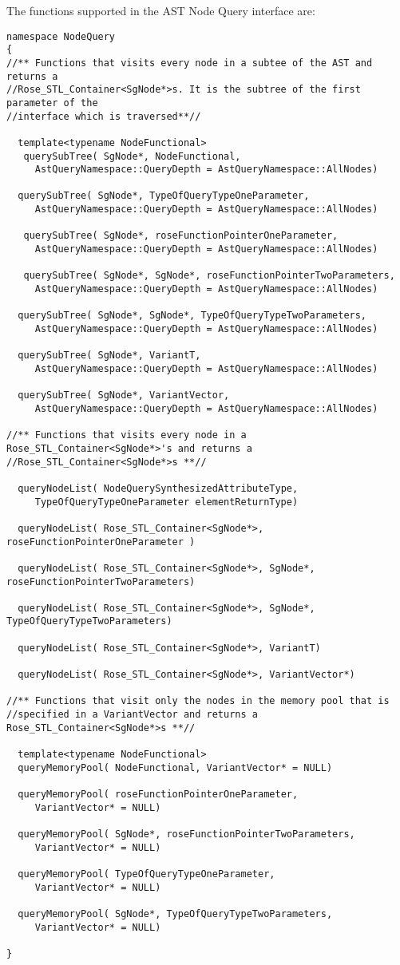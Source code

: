    The functions supported in the AST Node Query interface are:
{\mySmallFontSize
\begin{verbatim}
namespace NodeQuery
{
//** Functions that visits every node in a subtee of the AST and returns a
//Rose_STL_Container<SgNode*>s. It is the subtree of the first parameter of the
//interface which is traversed**//

  template<typename NodeFunctional>
   querySubTree( SgNode*, NodeFunctional, 
     AstQueryNamespace::QueryDepth = AstQueryNamespace::AllNodes)

  querySubTree( SgNode*, TypeOfQueryTypeOneParameter,
     AstQueryNamespace::QueryDepth = AstQueryNamespace::AllNodes)

   querySubTree( SgNode*, roseFunctionPointerOneParameter,
     AstQueryNamespace::QueryDepth = AstQueryNamespace::AllNodes)

   querySubTree( SgNode*, SgNode*, roseFunctionPointerTwoParameters,
     AstQueryNamespace::QueryDepth = AstQueryNamespace::AllNodes)
  
  querySubTree( SgNode*, SgNode*, TypeOfQueryTypeTwoParameters,
     AstQueryNamespace::QueryDepth = AstQueryNamespace::AllNodes)

  querySubTree( SgNode*, VariantT,
     AstQueryNamespace::QueryDepth = AstQueryNamespace::AllNodes)
     
  querySubTree( SgNode*, VariantVector,
     AstQueryNamespace::QueryDepth = AstQueryNamespace::AllNodes)

//** Functions that visits every node in a Rose_STL_Container<SgNode*>'s and returns a 
//Rose_STL_Container<SgNode*>s **//
  
  queryNodeList( NodeQuerySynthesizedAttributeType,
     TypeOfQueryTypeOneParameter elementReturnType)

  queryNodeList( Rose_STL_Container<SgNode*>, roseFunctionPointerOneParameter )

  queryNodeList( Rose_STL_Container<SgNode*>, SgNode*, roseFunctionPointerTwoParameters)

  queryNodeList( Rose_STL_Container<SgNode*>, SgNode*, TypeOfQueryTypeTwoParameters)
 
  queryNodeList( Rose_STL_Container<SgNode*>, VariantT)

  queryNodeList( Rose_STL_Container<SgNode*>, VariantVector*)

//** Functions that visit only the nodes in the memory pool that is
//specified in a VariantVector and returns a Rose_STL_Container<SgNode*>s **// 

  template<typename NodeFunctional>
  queryMemoryPool( NodeFunctional, VariantVector* = NULL)

  queryMemoryPool( roseFunctionPointerOneParameter, 
     VariantVector* = NULL)

  queryMemoryPool( SgNode*, roseFunctionPointerTwoParameters, 
     VariantVector* = NULL)

  queryMemoryPool( TypeOfQueryTypeOneParameter,
     VariantVector* = NULL)

  queryMemoryPool( SgNode*, TypeOfQueryTypeTwoParameters,
     VariantVector* = NULL)

}
\end{verbatim}
}


